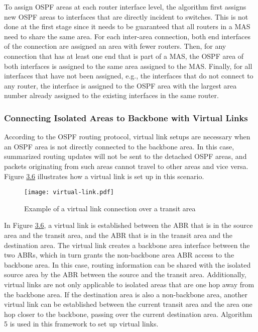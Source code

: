 \documentclass{uiucthesis2021}
\begin{document}
\noindent To assign OSPF areas at each router interface level, the algorithm first assigns new OSPF areas to interfaces that are directly incident to switches. This is not done at the first stage since it needs to be guaranteed that all routers in a MAS need to share the same area. For each inter-area connection, both end interfaces of the connection are assigned an area with fewer routers. Then, for any connection that has at least one end that is part of a MAS, the OSPF area of both interfaces is assigned to the same area assigned to the MAS. Finally, for all interfaces that have not been assigned, e.g., the interfaces that do not connect to any router, the interface is assigned to the OSPF area with the largest area number already assigned to the existing interfaces in the same router.\\

\subsubsection{Connecting Isolated Areas to Backbone with Virtual Links}
\noindent According to the OSPF routing protocol, virtual link setups are necessary when an OSPF area is not directly connected to the backbone area. In this case, summarized routing updates will not be sent to the detached OSPF areas, and packets originating from such areas cannot travel to other areas and vice versa. Figure \hyperref[c36]{3.6} illustrates how a virtual link is set up in this scenario. \\ 

\label{f36}
\begin{figure}[H]
\texttt{[image: virtual-link.pdf]}
\centering
\caption{Example of a virtual link connection over a transit area}
\centering
\end{figure}

\noindent In Figure \hyperref[c36]{3.6}, a virtual link is established between the ABR that is in the source area and the transit area, and the ABR that is in the transit area and the destination area. The virtual link creates a backbone area interface between the two ABRs, which in turn grants the non-backbone area ABR access to the backbone area. In this case, routing information can be shared with the isolated source area by the ABR between the source and the transit area. Additionally, virtual links are not only applicable to isolated areas that are one hop away from the backbone area. If the destination area is also a non-backbone area, another virtual link can be established between the current transit area and the area one hop closer to the backbone, passing over the current destination area. Algorithm 5 is used in this framework to set up virtual links. \\
\end{document}
